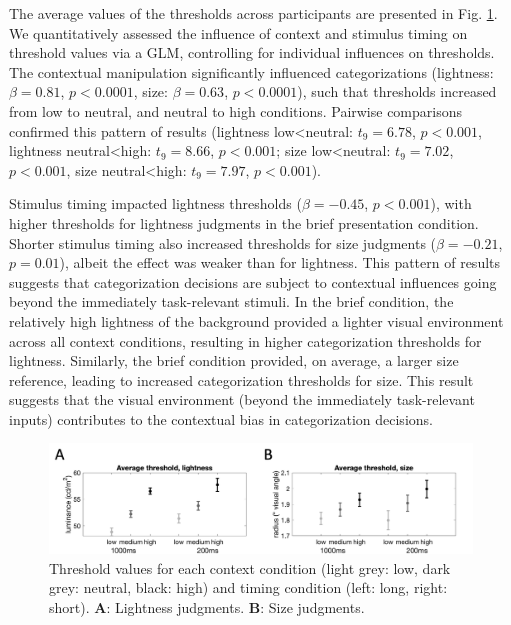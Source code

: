 \documentclass[a4paper, nobind]{templates/ociamthesis}
\begin{document}
The average values of the thresholds across participants are presented in Fig. \ref{fig:cat-psychom-a}. We quantitatively assessed the influence of context and stimulus timing on threshold values via a GLM, controlling for individual influences on thresholds. The contextual manipulation significantly influenced categorizations (lightness: \(\beta=0.81\), \(p<0.0001\), size: \(\beta=0.63\), \(p<0.0001\)), such that thresholds increased from low to neutral, and neutral to high conditions. Pairwise comparisons confirmed this pattern of results (lightness low\textless neutral: \(t_9=6.78\), \(p<0.001\), lightness neutral\textless high: \(t_9=8.66\), \(p<0.001\); size low\textless neutral: \(t_9=7.02\), \(p<0.001\), size neutral\textless high: \(t_9=7.97\), \(p<0.001\)).

Stimulus timing impacted lightness thresholds (\(\beta=-0.45\), \(p<0.001\)), with higher thresholds for lightness judgments in the brief presentation condition. Shorter stimulus timing also increased thresholds for size judgments (\(\beta=-0.21\), \(p=0.01\)), albeit the effect was weaker than for lightness. This pattern of results suggests that categorization decisions are subject to contextual influences going beyond the immediately task-relevant stimuli. In the brief condition, the relatively high lightness of the background provided a lighter visual environment across all context conditions, resulting in higher categorization thresholds for lightness. Similarly, the brief condition provided, on average, a larger size reference, leading to increased categorization thresholds for size. This result suggests that the visual environment (beyond the immediately task-relevant inputs) contributes to the contextual bias in categorization decisions.

\begin{figure}

{\centering \includegraphics[width=1\linewidth]{figures/cat-psychom-a} 

}

\caption[Experiment 1, Threshold values]{Threshold values for each context condition (light grey: low, dark grey: neutral, black: high) and timing condition (left: long, right: short). $\textbf{A:}$ Lightness judgments. $\textbf{B:}$ Size judgments.}\label{fig:cat-psychom-a}
\end{figure}
\end{document}
